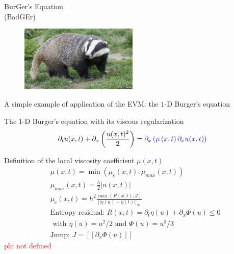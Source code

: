 \documentclass[xcolor=dvipsnames,10pt]{beamer}
\newcommand{\tcr}[1]{\textcolor{red}{#1}}
\begin{document}
\begin{frame}
\begin{center}
BurGer's Equation \\
(BadGEr)
\end{center}
\begin{figure}[H]
\centering
\includegraphics[width=0.5\textwidth]{../figures/badger.png}
\end{figure}
\end{frame}
\begin{frame}{A simple example of application of the EVM: the $1$-D Burger's equation}
\begin{block}{The $1$-D Burger's equation with its viscous regularization}
\begin{equation}
\partial_t u(x,t) + \partial_x \left( \frac{u(x,t)^2}{2} \right) = \textcolor{blue}{\partial_x \left( \mu \left(x,t \right) \partial_x u(x,t) \right)} \nonumber
\end{equation}
\end{block}
\begin{block}{Definition of the local viscosity coefficient $\mu(x,t)$}
\begin{align}
&\mu(x,t) = \min \left( \mu_e(x,t), \mu_{max}(x,t) \right) \nonumber \\
&\mu_{max} (x,t) = \frac{h}{2} | u(x,t) | \nonumber \\
&\mu_e(x,t) = h^2 \frac{\max \left( R(x,t), J \right)}{|| \eta(u) - \bar{\eta}(t) ||_\infty} \nonumber \\
& \text{Entropy residual: }R(x,t) = \partial_t \eta(u) + \partial_x \Phi(u) \leq 0 \nonumber \\ 
&\text{ with } \eta(u) = u^2 / 2 \text{ and } \Phi(u) = u^3 / 3 \nonumber \\
&\text{Jump: } J = [[ \partial_x \Phi(u) ]] \nonumber
\end{align}
\tcr{phi not defined}
\end{block}
\end{frame}
\end{document}
